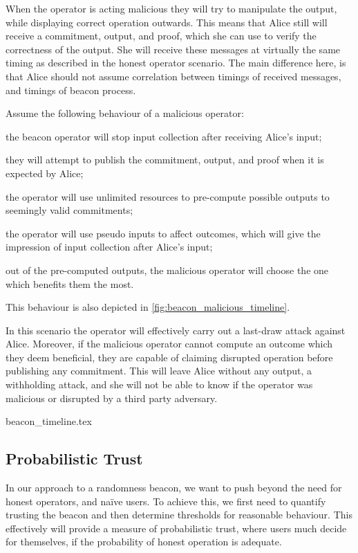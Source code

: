 When the operator is acting malicious they will try to manipulate the output, while displaying correct operation outwards.
This means that Alice still will receive a commitment, output, and proof, which she can use to verify the correctness of the output.
She will receive these messages at virtually the same timing as described in the honest operator scenario.
The main difference here, is that Alice should not assume correlation between timings of received messages, and timings of beacon process.

Assume the following behaviour of a malicious operator:
\begin{eletterate*}
\item the beacon operator will stop input collection after receiving Alice's input;
\item they will attempt to publish the commitment, output, and proof when it is expected by Alice;
\item the operator will use unlimited resources to pre-compute possible outputs to seemingly valid commitments;
\item the operator will use pseudo inputs to affect outcomes, which will give the impression of input collection after Alice's input;
\item out of the pre-computed outputs, the malicious operator will choose the one which benefits them the most.
\end{eletterate*}
This behaviour is also depicted in \cref{fig:beacon_malicious_timeline}.

In this scenario the operator will effectively carry out a last-draw attack against Alice.
Moreover, if the malicious operator cannot compute an outcome which they deem beneficial, they are capable of claiming disrupted operation before publishing any commitment.
This will leave Alice without any output, a withholding attack, and she will not be able to know if the operator was malicious or disrupted by a third party adversary.

{beacon_timeline.tex}

\subsection{Probabilistic Trust}%
\label{sub:probabilistic_trust}
In our approach to a randomness beacon, we want to push beyond the need for honest operators, and naïve users.
To achieve this, we first need to quantify trusting the beacon and then determine thresholds for reasonable behaviour.
This effectively will provide a measure of probabilistic trust, where users much decide for themselves, if the probability of honest operation is adequate.

